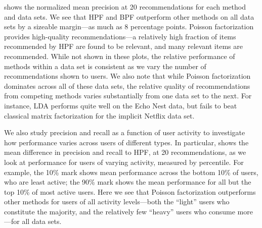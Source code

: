  shows the normalized mean precision at 20
recommendations for each method and data sets. We see that HPF and BPF
outperform other methods on all data sets by a sizeable margin---as
much as 8 percentage points. Poisson factorization provides high-quality
recommendations---a relatively high fraction of items recommended
by HPF are found to be relevant, and many relevant items are
recommended. While not shown in these plots, the relative performance
of methods within a data set is consistent as we vary the number of
recommendations shown to users. We also note that while Poisson
factorization dominates across all of these data sets, the relative
quality of recommendations from competing methods varies substantially
from one data set to the next. For instance, LDA performs quite well on
the Echo Nest data, but fails to beat classical matrix factorization
for the implicit Netflix data set.

We also study precision and recall as a function of user activity to
investigate how performance varies across users of different types. In
particular,  shows the mean difference
in precision and recall to HPF, at 20 recommendations, as we look at
performance for users of varying activity, measured by percentile. For example,
the 10\% mark shows mean performance across the bottom 10\% of users, who are
least active; the 90\% mark shows the mean performance for all but the top 10\%
of most active users. Here we see that Poisson factorization outperforms other
methods for users of all activity levels---both the ``light'' users who
constitute the majority, and the relatively few ``heavy'' users who consume
more---for all data sets.





